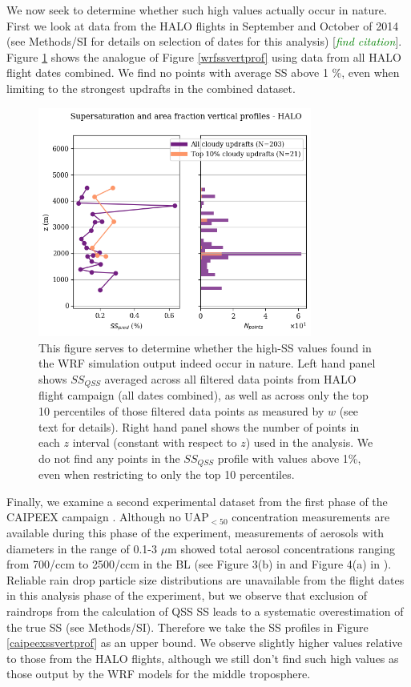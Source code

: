 \documentclass{article}
\newcommand{\todo}[1]{\textcolor{green}{\textit{#1}}}
\begin{document}
\clearpage
\newpage

We now seek to determine whether such high values actually occur in nature. First we look at data from the HALO flights in September and October of 2014 (see Methods/SI for details on selection of dates for this analysis) [\todo{find citation}]. Figure \ref{halossvertprof} shows the analogue of Figure \ref{wrfssvertprof} using data from all HALO flight dates combined. We find no points with average SS above 1 \%, even when limiting to the strongest updrafts in the combined dataset.

\begin{figure}[ht]
    \centering
    \includegraphics[width=9cm]{halo/ss_pred_vs_z_figure.png}
    \caption{This figure serves to determine whether the high-SS values found in the WRF simulation output indeed occur in nature. Left hand panel shows $SS_{QSS}$ averaged across all filtered data points from HALO flight campaign (all dates combined), as well as across only the top 10 percentiles of those filtered data points as measured by $w$ (see text for details). Right hand panel shows the number of points in each $z$ interval (constant with respect to $z$) used in the analysis. We do not find any points in the $SS_{QSS}$ profile with values above 1\%, even when restricting to only the top 10 percentiles.}
    \label{halossvertprof}
\end{figure}

Finally, we examine a second experimental dataset from the first phase of the CAIPEEX campaign \cite{Kulkarni2012}. Although no UAP$_{<50}$ concentration measurements are available during this phase of the experiment, measurements of aerosols with diameters in the range of 0.1-3 $\mu$m showed total aerosol concentrations ranging from 700/ccm to 2500/ccm in the BL (see Figure 3(b) in \cite{Prabha2011} and Figure 4(a) in \cite{Kulkarni2012}). Reliable rain drop particle size distributions are unavailable from the flight dates in this analysis phase of the experiment, but we observe that exclusion of raindrops from the calculation of QSS SS leads to a systematic overestimation of the true SS (see Methods/SI). Therefore we take the SS profiles in Figure \ref{caipeexssvertprof} as an upper bound. We observe slightly higher values relative to those from the HALO flights, although we still don't find such high values as those output by the WRF models for the middle troposphere.
\end{document}
